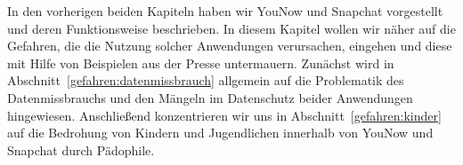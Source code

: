 In den vorherigen beiden Kapiteln haben wir YouNow und Snapchat vorgestellt und
deren Funktionsweise beschrieben. In diesem Kapitel wollen wir n\"aher auf die
Gefahren, die die Nutzung solcher Anwendungen verursachen, eingehen und diese
mit Hilfe von Beispielen aus der Presse untermauern. Zun\"achst wird in
Abschnitt~\ref{gefahren:datenmissbrauch} allgemein auf die Problematik des
Datenmissbrauchs und den M\"angeln im Datenschutz beider Anwendungen
hingewiesen. Anschlie{\ss}end konzentrieren wir uns in
Abschnitt~\ref{gefahren:kinder} auf die Bedrohung von Kindern und Jugendlichen
innerhalb von YouNow und Snapchat durch P\"adophile.
